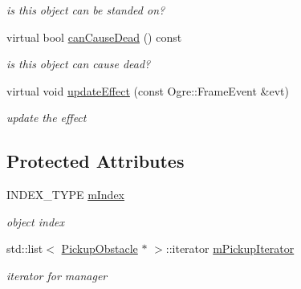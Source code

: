 \begin{DoxyCompactItemize}
\begin{DoxyCompactList}\small\item\em is this object can be standed on? \end{DoxyCompactList}\item 
virtual bool \hyperlink{class_n_c_t_u_1_1_pickup_obstacle_acef3668c5a562f6f18d248f418860d96}{can\+Cause\+Dead} () const \hypertarget{class_n_c_t_u_1_1_pickup_obstacle_acef3668c5a562f6f18d248f418860d96}{}\label{class_n_c_t_u_1_1_pickup_obstacle_acef3668c5a562f6f18d248f418860d96}

\begin{DoxyCompactList}\small\item\em is this object can cause dead? \end{DoxyCompactList}\item 
virtual void \hyperlink{class_n_c_t_u_1_1_pickup_obstacle_af4c760c60513ae7baebf0cdc9c15b9f1}{update\+Effect} (const Ogre\+::\+Frame\+Event \&evt)\hypertarget{class_n_c_t_u_1_1_pickup_obstacle_af4c760c60513ae7baebf0cdc9c15b9f1}{}\label{class_n_c_t_u_1_1_pickup_obstacle_af4c760c60513ae7baebf0cdc9c15b9f1}

\begin{DoxyCompactList}\small\item\em update the effect \end{DoxyCompactList}\end{DoxyCompactItemize}
\subsection*{Protected Attributes}
\begin{DoxyCompactItemize}
\item 
I\+N\+D\+E\+X\+\_\+\+T\+Y\+PE \hyperlink{class_n_c_t_u_1_1_pickup_obstacle_aa0886165088dcface28d35cf1b52f73a}{m\+Index}\hypertarget{class_n_c_t_u_1_1_pickup_obstacle_aa0886165088dcface28d35cf1b52f73a}{}\label{class_n_c_t_u_1_1_pickup_obstacle_aa0886165088dcface28d35cf1b52f73a}

\begin{DoxyCompactList}\small\item\em object index \end{DoxyCompactList}\item 
std\+::list$<$ \hyperlink{class_n_c_t_u_1_1_pickup_obstacle}{Pickup\+Obstacle} $\ast$ $>$\+::iterator \hyperlink{class_n_c_t_u_1_1_pickup_obstacle_aac1104c755a32023cbceabcb0385de33}{m\+Pickup\+Iterator}\hypertarget{class_n_c_t_u_1_1_pickup_obstacle_aac1104c755a32023cbceabcb0385de33}{}\label{class_n_c_t_u_1_1_pickup_obstacle_aac1104c755a32023cbceabcb0385de33}

\begin{DoxyCompactList}\small\item\em iterator for manager \end{DoxyCompactList}\end{DoxyCompactItemize}
